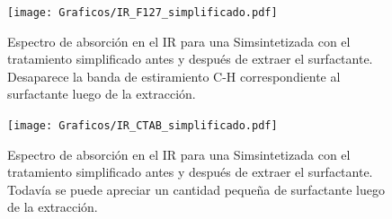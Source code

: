 	
		 \begin{figure}
				\centering
				\texttt{[image: Graficos/IR\_F127\_simplificado.pdf]}
				\caption[FTIR \pdmF\space tratamiento simplificado.]{Espectro de absorción en el IR para una Sim\pdmF\space sintetizada con el tratamiento simplificado antes y después de extraer el surfactante. Desaparece la banda de estiramiento C-H correspondiente al surfactante luego de la extracción.}
				\label{fig:IR_F127_simplificado}
				\end{figure}
			
	  
	      \begin{figure}
			\centering
			\texttt{[image: Graficos/IR\_CTAB\_simplificado.pdf]}
			\caption[FTIR \pdmC\space tratamiento simplificado.]{Espectro de absorción en el IR para una Sim\pdmC\space sintetizada con el tratamiento simplificado antes y después de extraer el surfactante. Todavía se puede apreciar un cantidad pequeña de surfactante luego de la extracción.}
			\label{fig:IR_CTAB_simplificado}
			\end{figure}	


